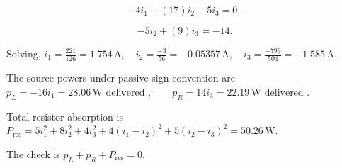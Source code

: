 \documentclass[11pt]{article}
\begin{document}
\[-4i_1+(17)i_2-5i_3=0,\]

\[-5i_2+(9)i_3=-14.\]

Solving, $i_1=\frac{221}{126}=1.754\,\text{A},\quad i_2=\frac{-3}{56}=-0.05357\,\text{A},\quad i_3=\frac{-799}{504}=-1.585\,\text{A}.$\par

The source powers under passive sign convention are $p_L=-16i_1=28.06\,\text{W}\text{ delivered },\qquad p_R=14i_3=22.19\,\text{W}\text{ delivered }.$\par

Total resistor absorption is $P_{\text{res}}=5i_1^2+8i_2^2+4i_3^2+4(i_1-i_2)^2+5(i_2-i_3)^2=50.26\,\text{W}.$\par

The check is $p_L+p_R+P_{\text{res}}=0.$\par
\end{document}
